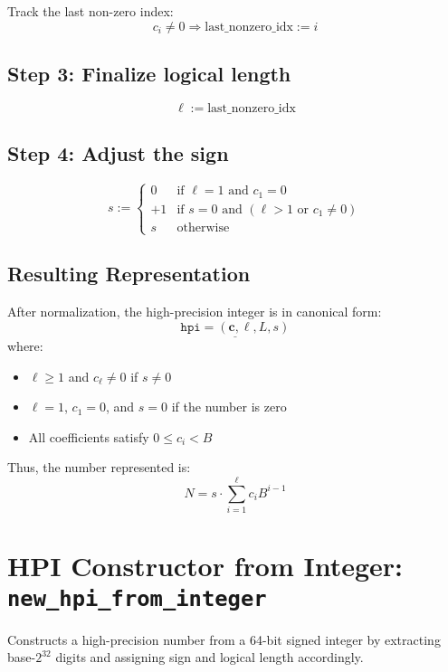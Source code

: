 \documentclass[11pt]{article}
\begin{document}
	Track the last non-zero index:
	\[ c_i \ne 0 \Rightarrow \text{last\_nonzero\_idx} := i \]
	
	
	\subsection*{Step 3: Finalize logical length}
	\[ \ell := \text{last\_nonzero\_idx} \]
	
	
	\subsection*{Step 4: Adjust the sign}
	\[
	s := \begin{cases}
		0 & \text{if } \ell = 1 \text{ and } c_1 = 0 \\
		+1 & \text{if } s = 0 \text{ and } (\ell > 1 \text{ or } c_1 \ne 0) \\
		s & \text{otherwise}
	\end{cases}
	\]
	

	\subsection*{Resulting Representation}
	
	After normalization, the high-precision integer is in canonical form:
	\[
	\underline{\texttt{hpi} = (\mathbf{c}, \ell, L, s)}
	\]
	where:
	\begin{itemize}
		\item \( \ell \ge 1 \) and \( c_\ell \ne 0 \) if \( s \ne 0 \)
		\item \( \ell = 1 \), \( c_1 = 0 \), and \( s = 0 \) if the number is zero
		\item All coefficients satisfy \( 0 \le c_i < B \)
	\end{itemize}
	Thus, the number represented is:
	\[
	N = s \cdot \sum_{i=1}^\ell c_i B^{i-1}
	\]
	
	\newpage

	\section{HPI Constructor from Integer: \texttt{new\_hpi\_from\_integer}}
	
	Constructs a high-precision number from a 64-bit signed integer by extracting base-\(2^{32}\) digits and assigning sign and logical length accordingly.
	
\end{document}
